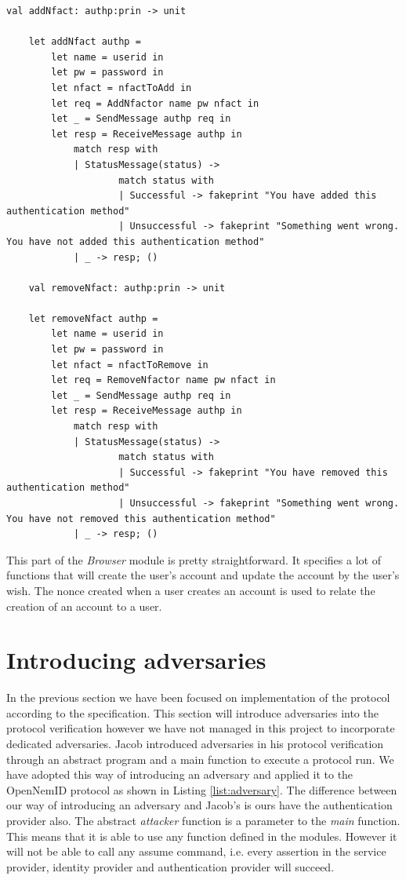 \documentclass[twosided]{report}
\begin{document}
\begin{lstlisting}[style=fstar, caption={The Browser's side of the account creation and changing}]
	val addNfact: authp:prin -> unit

	let addNfact authp =
		let name = userid in
		let pw = password in
		let nfact = nfactToAdd in
		let req = AddNfactor name pw nfact in
		let _ = SendMessage authp req in
		let resp = ReceiveMessage authp in
			match resp with
			| StatusMessage(status) ->
					match status with
					| Successful -> fakeprint "You have added this authentication method"
					| Unsuccessful -> fakeprint "Something went wrong. You have not added this authentication method"
			| _ -> resp; ()

	val removeNfact: authp:prin -> unit

	let removeNfact authp =
		let name = userid in
		let pw = password in
		let nfact = nfactToRemove in
		let req = RemoveNfactor name pw nfact in
		let _ = SendMessage authp req in
		let resp = ReceiveMessage authp in
			match resp with
			| StatusMessage(status) ->
					match status with
					| Successful -> fakeprint "You have removed this authentication method"
					| Unsuccessful -> fakeprint "Something went wrong. You have not removed this authentication method"
			| _ -> resp; ()
\end{lstlisting}

This part of the \emph{Browser} module is pretty straightforward. It specifies a lot of functions that will create the user's account and update the account by the user's wish. The nonce created when a user creates an account is used to relate the creation of an account to a user.

\section{Introducing adversaries}
\label{sect:introadversary}
In the previous section we have been focused on implementation of the protocol according to the specification. This section will introduce adversaries into the protocol verification however we have not managed in this project to incorporate dedicated adversaries. Jacob introduced adversaries in his protocol verification through an abstract program and a main function to execute a protocol run. We have adopted this way of introducing an adversary and applied it to the OpenNemID protocol as shown in Listing \ref{list:adversary}. The difference between our way of introducing an adversary and Jacob's is ours have the authentication provider also. The abstract \emph{attacker} function is a parameter to the \emph{main} function. This means that it is able to use any function defined in the modules. However it will not be able to call any assume command, i.e. every assertion in the service provider, identity provider and authentication provider will succeed.
\end{document}
